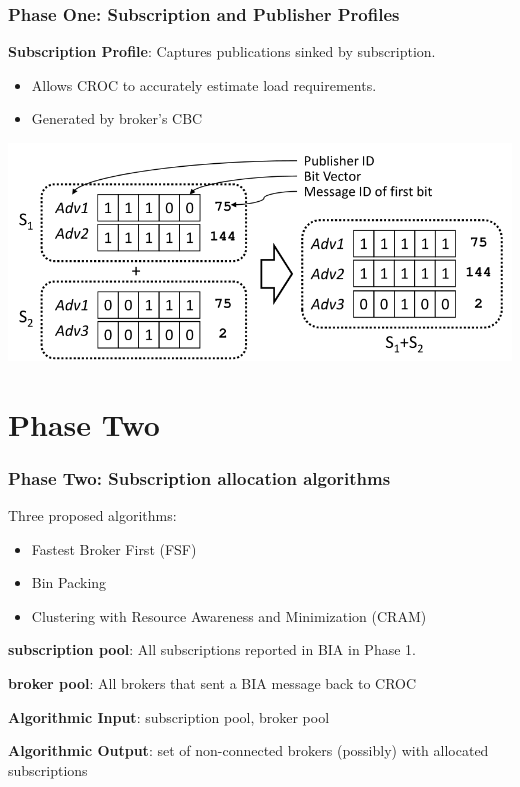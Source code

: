 \documentclass{beamer}
\begin{document}
\begin{frame}
\frametitle{Phase One: Subscription and Publisher Profiles}
\textbf{Subscription Profile}: Captures publications sinked by subscription.
\begin{itemize}
\item Allows CROC to accurately estimate load requirements.
\item Generated by broker's CBC
\end{itemize}

\includegraphics[scale=0.4]{profiles.png}

\end{frame}



\section{Phase Two}
\begin{frame}
\frametitle{Phase Two: Subscription allocation algorithms}
Three proposed algorithms:
\begin{itemize}
\item Fastest Broker First (FSF)
\item Bin Packing
\item Clustering with Resource Awareness and
Minimization (CRAM)
\end{itemize}

\textbf{subscription pool}: All subscriptions reported in BIA in Phase 1.

\textbf{broker pool}: All brokers that sent a BIA message back to CROC

\textbf{Algorithmic Input}: subscription pool, broker pool

\textbf{Algorithmic Output}: set of non-connected brokers (possibly) with allocated subscriptions

\end{frame}
\end{document}
